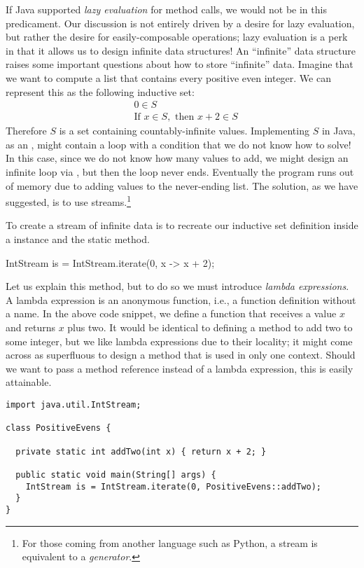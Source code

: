 If Java supported \textit{lazy evaluation} for method calls, we would not be in this predicament. Our discussion is not entirely driven by a desire for lazy evaluation, but rather the desire for easily-composable operations; lazy evaluation is a perk in that it allows us to design infinite data structures! An ``infinite'' data structure raises some important questions about how to store ``infinite'' data. Imagine that we want to compute a list that contains every positive even integer. We can represent this as the following inductive set:
\begin{align*}
    &0 \in S\\
    &\text{If } x \in S,\text{ then }x + 2 \in S
\end{align*}
Therefore $S$ is a set containing countably-infinite values. Implementing $S$ in Java, as an , might contain a  loop with a condition that we do not know how to solve! In this case, since we do not know how many values to add, we might design an infinite loop via , but then the loop never ends. Eventually the program runs out of memory due to adding values to the never-ending list. The solution, as we have suggested, is to use streams.\footnote{For those coming from another language such as Python, a stream is equivalent to a \textit{generator}.}

To create a stream of infinite data is to recreate our inductive set definition inside a  instance and the  static method.

\begin{verbnobox}[\small]
IntStream is = IntStream.iterate(0, x -> x + 2);
\end{verbnobox}

Let us explain this method, but to do so we must introduce \textit{lambda expressions}. A lambda expression is an anonymous function, i.e., a function definition without a name. In the above code snippet, we define a function that receives a value $x$ and returns $x$ plus two. It would be identical to defining a  method to add two to some integer, but we like lambda expressions due to their locality; it might come across as superfluous to design a method that is used in only one context. Should we want to pass a method reference instead of a lambda expression, this is easily attainable.
\begin{cl}[]{}
\begin{lstlisting}[language=MyJava]
import java.util.IntStream;

class PositiveEvens {

  private static int addTwo(int x) { return x + 2; }

  public static void main(String[] args) {
    IntStream is = IntStream.iterate(0, PositiveEvens::addTwo);
  }
}   
\end{lstlisting}
\end{cl}

